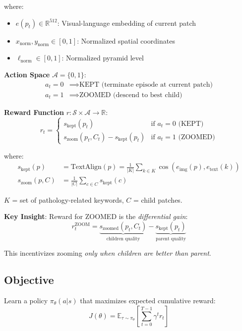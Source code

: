 \documentclass[11pt]{article}
\begin{document}
where:
\begin{itemize}[nosep]
    \item $e(p_t) \in \mathbb{R}^{512}$: Visual-language embedding of current patch
    \item $x_{\text{norm}}, y_{\text{norm}} \in [0,1]$: Normalized spatial coordinates
    \item $\ell_{\text{norm}} \in [0,1]$: Normalized pyramid level
\end{itemize}

\textbf{Action Space} $\mathcal{A} = \{0, 1\}$:
\begin{align}
a_t = 0 &\implies \text{KEPT (terminate episode at current patch)} \\
a_t = 1 &\implies \text{ZOOMED (descend to best child)}
\end{align}

\textbf{Reward Function} $r: \mathcal{S} \times \mathcal{A} \to \mathbb{R}$:
\begin{equation}
r_t = \begin{cases}
s_{\text{kept}}(p_t) & \text{if } a_t = 0 \text{ (KEPT)} \\
s_{\text{zoom}}(p_t, C_t) - s_{\text{kept}}(p_t) & \text{if } a_t = 1 \text{ (ZOOMED)}
\end{cases}
\end{equation}

where:
\begin{align}
s_{\text{kept}}(p) &= \text{TextAlign}(p) = \frac{1}{|K|} \sum_{k \in K} \cos(e_{\text{img}}(p), e_{\text{text}}(k)) \\
s_{\text{zoom}}(p, C) &= \frac{1}{|C|} \sum_{c \in C} s_{\text{kept}}(c)
\end{align}

$K$ = set of pathology-related keywords, $C$ = child patches.

\textbf{Key Insight}: Reward for ZOOMED is the \emph{differential gain}:
\begin{equation}
\boxed{r_t^{\text{ZOOM}} = \underbrace{s_{\text{zoomed}}(p_t, C_t)}_{\text{children quality}} - \underbrace{s_{\text{kept}}(p_t)}_{\text{parent quality}}}
\end{equation}

This incentivizes zooming \emph{only when children are better than parent}.

\subsection{Objective}
Learn a policy $\pi_\theta(a|s)$ that maximizes expected cumulative reward:
\begin{equation}
J(\theta) = \mathbb{E}_{\tau \sim \pi_\theta} \left[ \sum_{t=0}^{T-1} \gamma^t r_t \right]
\end{equation}
\end{document}
